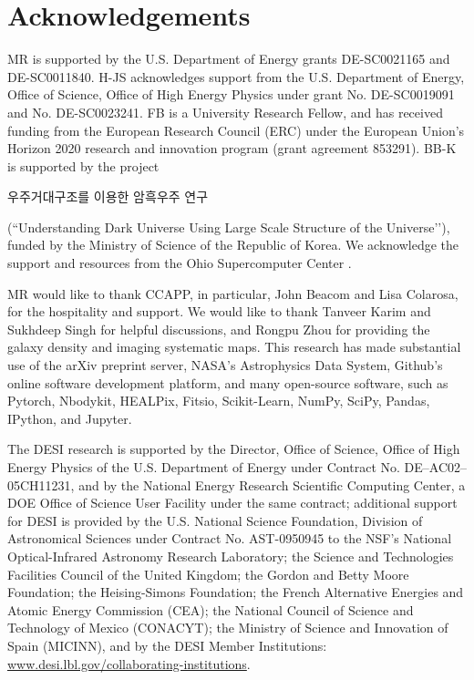 \section*{Acknowledgements}
MR is supported by the U.S. Department of Energy grants DE-SC0021165 and DE-SC0011840. H-JS acknowledges support from the U.S. Department of Energy, Office of Science, 
Office of High Energy Physics under grant No. DE-SC0019091 and No. DE-SC0023241. FB is a University Research Fellow, and has received funding from the European Research Council (ERC) under the European Union’s Horizon 2020 research and innovation program (grant agreement 853291). BB-K is supported by the project \begin{CJK}{UTF8}{mj}우주거대구조를 이용한 암흑우주 연구\end{CJK} (``Understanding Dark Universe Using Large Scale Structure of the Universe’’), funded by the Ministry of Science of the Republic of Korea. We acknowledge the support and resources from the Ohio Supercomputer Center \citep[OSC;][]{OhioSupercomputerCenter1987}.  


MR would like to thank CCAPP, in particular, John Beacom and Lisa Colarosa, for the hospitality and support. We would like to thank Tanveer Karim and Sukhdeep Singh for helpful discussions, and Rongpu Zhou for providing the galaxy density and imaging systematic maps. This research has made substantial use of the arXiv preprint server, NASA’s Astrophysics Data System, Github's online software development platform, and many open-source software, such as Pytorch, Nbodykit, HEALPix, Fitsio, Scikit-Learn, NumPy, SciPy, Pandas, IPython, and Jupyter. 


The DESI research is supported by the Director, Office of Science, Office of High Energy Physics of the U.S. Department of Energy under Contract No. DE–AC02–05CH11231, and by the National Energy Research Scientific Computing Center, a DOE Office of Science User Facility under the same contract; additional support for DESI is provided by the U.S. National Science Foundation, Division of Astronomical Sciences under Contract No. AST-0950945 to the NSF’s National Optical-Infrared Astronomy Research Laboratory; the Science and Technologies Facilities Council of the United Kingdom; the Gordon and Betty Moore Foundation; the Heising-Simons Foundation; the French Alternative Energies and Atomic Energy Commission (CEA); the National Council of Science and Technology of Mexico (CONACYT); the Ministry of Science and Innovation of Spain (MICINN), and by the DESI Member Institutions: \href{https://www.desi.lbl.gov/collaborating-institutions}{www.desi.lbl.gov/collaborating-institutions}. 

